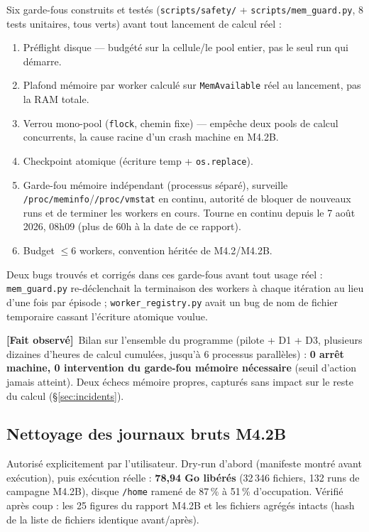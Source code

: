 \documentclass[11pt,a4paper]{article}
\newcommand{\code}[1]{\texttt{#1}}
\newcommand{\fait}{\textbf{[Fait observé]}}
\begin{document}
Six garde-fous construits et testés (\code{scripts/safety/} +
\code{scripts/mem\_guard.py}, 8 tests unitaires, tous verts) avant tout
lancement de calcul réel :
\begin{enumerate}
\item Préflight disque --- budgété sur la cellule/le pool entier, pas le
  seul run qui démarre.
\item Plafond mémoire par worker calculé sur \code{MemAvailable} réel au
  lancement, pas la RAM totale.
\item Verrou mono-pool (\code{flock}, chemin fixe) --- empêche deux pools
  de calcul concurrents, la cause racine d'un crash machine en M4.2B.
\item Checkpoint atomique (écriture temp + \code{os.replace}).
\item Garde-fou mémoire indépendant (processus séparé), surveille
  \code{/proc/meminfo}/\code{/proc/vmstat} en continu, autorité de
  bloquer de nouveaux runs et de terminer les workers en cours. Tourne en
  continu depuis le 7 août 2026, 08h09 (plus de 60h à la date de ce
  rapport).
\item Budget $\le 6$ workers, convention héritée de M4.2/M4.2B.
\end{enumerate}

Deux bugs trouvés et corrigés dans ces garde-fous avant tout usage réel :
\code{mem\_guard.py} re-déclenchait la terminaison des workers à chaque
itération au lieu d'une fois par épisode ; \code{worker\_registry.py}
avait un bug de nom de fichier temporaire cassant l'écriture atomique
voulue.

\fait\ Bilan sur l'ensemble du programme (pilote + D1 + D3, plusieurs
dizaines d'heures de calcul cumulées, jusqu'à 6 processus parallèles) :
\textbf{0 arrêt machine, 0 intervention du garde-fou mémoire nécessaire}
(seuil d'action jamais atteint). Deux échecs mémoire propres, capturés
sans impact sur le reste du calcul (\S\ref{sec:incidents}).

\subsection{Nettoyage des journaux bruts M4.2B}

Autorisé explicitement par l'utilisateur. Dry-run d'abord (manifeste
montré avant exécution), puis exécution réelle : \textbf{78,94 Go
libérés} (32\,346 fichiers, 132 runs de campagne M4.2B), disque
\code{/home} ramené de 87\,\% à 51\,\% d'occupation. Vérifié après coup :
les 25 figures du rapport M4.2B et les fichiers agrégés intacts (hash de
la liste de fichiers identique avant/après).
\end{document}
